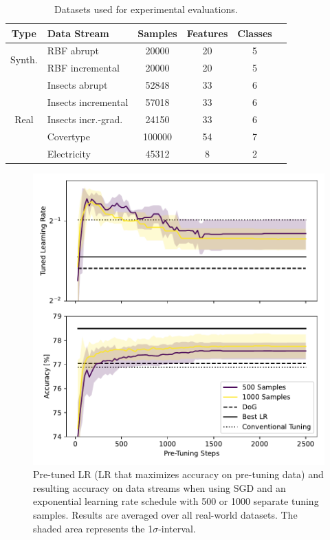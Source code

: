 \documentclass[letterpaper]{article} %
\begin{document}
\begin{table}[ht]
	\small
	\begin{tabular}{@{}clcccc@{}}
		\toprule
		Type                    & Data Stream            & Samples & Features & Classes \\
		\midrule
		\multirow{2}{*}{Synth.} & RBF abrupt             & 20000   & 20       & 5       \\
		                        & RBF incremental        & 20000   & 20       & 5       \\
		\midrule
		\multirow{5}{*}{Real}   & Insects abrupt         & 52848   & 33       & 6       \\
		                        & Insects incremental    & 57018   & 33       & 6       \\
		                        & Insects incr.-grad.    & 24150   & 33       & 6       \\
		                        & Covertype\footnotemark & 100000  & 54       & 7       \\
		                        & Electricity            & 45312   & 8        & 2       \\
		\bottomrule
	\end{tabular}\label{tab:datasets}
	\caption{Datasets used for experimental evaluations.}
\end{table}



\begin{figure}
	\centering
	\includegraphics[width=.45\textwidth]{figures/pretune_1x64_acc_lr_exp_schedule.pdf}
	\caption{Pre-tuned LR (LR that maximizes accuracy on pre-tuning data) and resulting accuracy on data streams when using SGD and an exponential learning rate schedule with 500 or 1000 separate tuning samples. Results are averaged over all real-world datasets. The shaded area represents the 1$\sigma$-interval.}\label{fig:pretune_lr_accuracy}
\end{figure}
\end{document}
